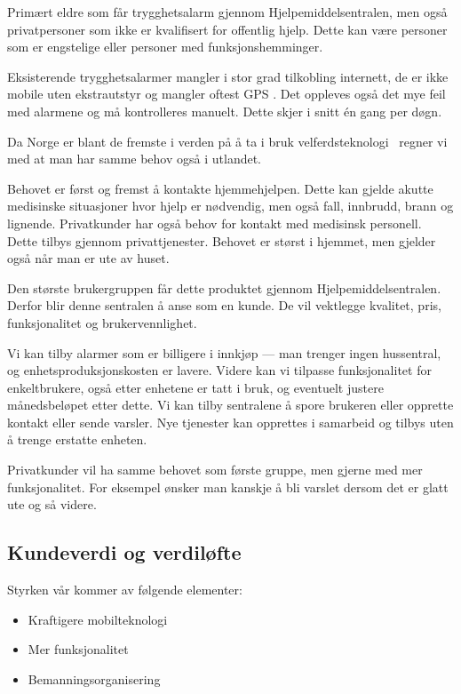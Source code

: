 
Primært eldre som får trygghetsalarm gjennom Hjelpemiddelsentralen, men også
privatpersoner som ikke er kvalifisert for offentlig hjelp. Dette kan være
personer som er engstelige eller personer med funksjonshemminger.

Eksisterende trygghetsalarmer mangler i stor grad tilkobling internett, de er
ikke mobile uten ekstrautstyr og mangler oftest GPS \cite{sverige.alarm}.
Det oppleves også det mye feil med alarmene og må kontrolleres manuelt. Dette
skjer i snitt én gang per døgn.

Da Norge er blant de fremste i verden på å ta i bruk velferdsteknologi
\cite{telenor.undersokelse} regner vi med at man har samme behov også i
utlandet.

Behovet er først og fremst å kontakte hjemmehjelpen. Dette kan gjelde akutte
medisinske situasjoner hvor hjelp er nødvendig, men også fall, innbrudd, brann
og lignende. Privatkunder har også behov for kontakt med medisinsk personell.
Dette tilbys gjennom privattjenester. Behovet er størst i hjemmet, men gjelder
også når man er ute av huset.

Den største brukergruppen får dette produktet gjennom Hjelpemiddelsentralen.
Derfor blir denne sentralen å anse som en kunde. De vil vektlegge kvalitet,
pris, funksjonalitet og brukervennlighet.

Vi kan tilby alarmer som er billigere i innkjøp --- man trenger ingen
hussentral, og enhetsproduksjonskosten er lavere. Videre kan vi tilpasse
funksjonalitet for enkeltbrukere, også etter enhetene er tatt i bruk, og
eventuelt justere månedsbeløpet etter dette. Vi kan tilby sentralene å spore
brukeren eller opprette kontakt eller sende varsler.  Nye tjenester kan
opprettes i samarbeid og tilbys uten å trenge erstatte enheten.

Privatkunder vil ha samme behovet som første gruppe, men gjerne med mer
funksjonalitet. For eksempel ønsker man kanskje å bli varslet dersom det er
glatt ute og så videre.

\subsection{Kundeverdi og verdiløfte}

Styrken vår kommer av følgende elementer:

\begin{itemize}
  \item Kraftigere mobilteknologi
  \item Mer funksjonalitet
  \item Bemanningsorganisering
\end{itemize}

